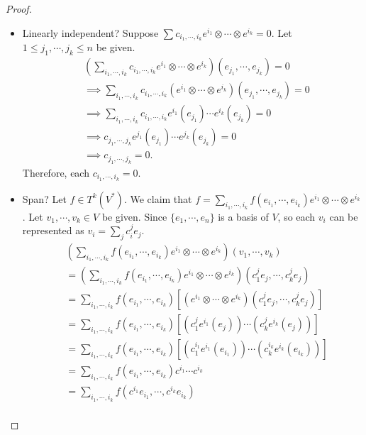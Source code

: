 \documentclass[12pt, psamsfonts]{amsart}
\theoremstyle{definition}
\theoremstyle{remark}
\numberwithin{equation}{section}
\begin{document}
\begin{proof}
$ $
  \begin{itemize}
    \item
      Linearly independent?
      Suppose $\sum c_{i_1, \cdots, i_k} e^{i_1} \otimes \cdots \otimes e^{i_k} = 0$.
      Let $1 \leq j_1, \cdots, j_k \leq n$ be given.
      \begin{align*}
        &(\sum_{i_1, \cdots, i_k} c_{i_1, \cdots, i_k} e^{i_1} \otimes \cdots \otimes e^{i_k})(e_{j_1}, \cdots, e_{j_k}) = 0 \\
          &\implies \sum_{i_1, \cdots, i_k} c_{i_1, \cdots, i_k} (e^{i_1} \otimes \cdots \otimes e^{i_k})(e_{j_1}, \cdots, e_{j_k}) = 0 \\
          &\implies \sum_{i_1, \cdots, i_k} c_{i_1, \cdots, i_k} e^{i_1}(e_{j_1}) \cdots e^{i_k}(e_{j_k}) = 0 \\
          &\implies c_{j_1, \cdots, j_k} e^{j_1}(e_{j_1}) \cdots e^{j_k}(e_{j_k}) = 0 \\
          &\implies c_{j_1, \cdots, j_k} = 0.
      \end{align*}
      Therefore, each $c_{i_1, \cdots, i_k} = 0$.
    \item
      Span?
      Let $f \in T^k(V^*)$.
      We claim that $f = \sum_{i_1, \cdots, i_k} f(e_{i_1}, \cdots, e_{i_k})e^{i_1} \otimes \cdots \otimes e^{i_k}$.
      Let $v_1, \cdots, v_k \in V$ be given.
      Since $\{ e_1, \cdots, e_n \}$ is a basis of $V$, so each $v_i$ can be represented as $v_i = \sum_{j} c^j_ie_j$.
      \begin{align*}
        &(\sum_{i_1, \cdots, i_k} f(e_{i_1}, \cdots, e_{i_k})e^{i_1} \otimes \cdots \otimes e^{i_k})(v_1, \cdots, v_k) \\
          &= (\sum_{i_1, \cdots, i_k} f(e_{i_1}, \cdots, e_{i_k})e^{i_1} \otimes \cdots \otimes e^{i_k})(c^j_1e_j, \cdots, c^j_ke_j) \\
          &= \sum_{i_1, \cdots, i_k} f(e_{i_1}, \cdots, e_{i_k})[(e^{i_1} \otimes \cdots \otimes e^{i_k})(c^j_1e_j, \cdots, c^j_ke_j)] \\
          &= \sum_{i_1, \cdots, i_k} f(e_{i_1}, \cdots, e_{i_k})[(c^j_1e^{i_1}(e_j)) \cdots (c^j_ke^{i_k}(e_j))] \\
          &= \sum_{i_1, \cdots, i_k} f(e_{i_1}, \cdots, e_{i_k})[(c^{i_1}_1e^{i_1}(e_{i_1})) \cdots (c^{i_k}_ke^{i_k}(e_{i_k}))] \\
          &= \sum_{i_1, \cdots, i_k} f(e_{i_1}, \cdots, e_{i_k})c^{i_1} \cdots c^{i_k} \\
          &= \sum_{i_1, \cdots, i_k} f(c^{i_1}e_{i_1}, \cdots, c^{i_k}e_{i_k}) \\

\end{align*}
\end{itemize}
\end{proof}
\end{document}

